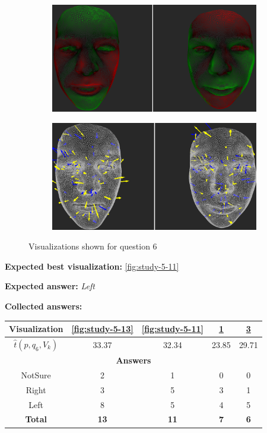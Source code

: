 \begin{figure}[h]
\begin{subfigure}{0.49\textwidth}
\includegraphics[width=\textwidth]{./img-study/pair12.PNG}
\caption{}
\label{fig:study-5-12}
\end{subfigure}
\begin{subfigure}{0.49\textwidth}
\includegraphics[width=\textwidth]{./img-study/pair14.PNG}
\caption{}
\label{fig:study-5-14}
\end{subfigure}
\caption{Visualizations shown for question 6}
\end{figure}
\medskip

{\bf Expected best visualization:} \ref{fig:study-5-11}
\medskip

{\bf Expected answer:} {\it Left}
\medskip

{\bf Collected answers:}

\begin{center}
\begin{tabular}{| c | c | c | c | c |}
	\hline
	Visualization & \ref{fig:study-5-13} & \ref{fig:study-5-11} & \ref{fig:study-5-12} & \ref{fig:study-5-14}\\ \hline
	\(\widehat{t}(p, q_6, V_k)\) & 33.37 & 32.34 & 23.85 & 29.71\\ \hline
	\multicolumn{5}{|c|}{\bf Answers} \\ \hline
	NotSure & 2 & 1 & 0 & 0\\ \hline
	Right & 3 & 5 & 3 & 1\\ \hline
	\rowcolor{yellow!30} Left & 8 & 5 & 4 & 5\\ \hline
	{\bf Total} & {\bf 13} & {\bf 11} & {\bf 7} & {\bf 6}\\ \hline
\end{tabular}
\end{center}
\clearpage


